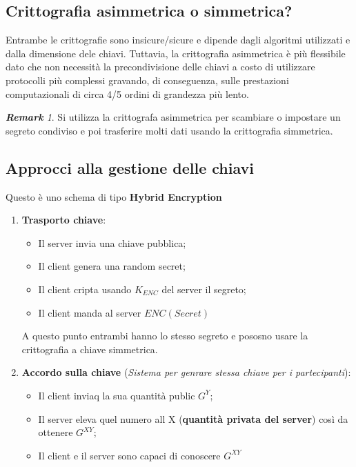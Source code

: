 \documentclass{book}
\theoremstyle{remark}
\newtheorem*{remark}{\textbf{Remark}}
\begin{document}
\subsection{Crittografia asimmetrica o simmetrica?}
Entrambe le crittografie sono insicure/sicure e dipende dagli algoritmi utilizzati e dalla dimensione dele chiavi\@. Tuttavia, la crittografia asimmetrica è più flessibile dato che non necessità la precondivisione delle chiavi a costo di utilizzare protocolli più complessi gravando, di conseguenza,
sulle prestazioni computazionali di circa 4/5 ordini di grandezza più lento\@.
\begin{remark}
	Si utilizza la crittografa asimmetrica per scambiare o impostare un segreto condiviso e poi trasferire molti dati usando la crittografia simmetrica\@.
\end{remark}
\subsection{Approcci alla gestione delle chiavi}
Questo è uno schema di tipo \textbf{Hybrid Encryption}
\begin{enumerate}
	\item \textbf{Trasporto chiave}:\begin{itemize}
		      \item Il server invia una chiave pubblica;\@
		      \item Il client genera una random secret;\@
		      \item Il client cripta usando \(K_{ENC}\) del server il segreto;\@
		      \item Il client manda al server \(ENC (Secret)\)
	      \end{itemize}
	      A questo punto entrambi hanno lo stesso segreto e pososno usare la crittografia a chiave simmetrica\@.
	\item \textbf{Accordo sulla chiave} (\emph{Sistema per genrare stessa chiave per i partecipanti}):\begin{itemize}
		      \item Il client inviaq la sua quantità public \(G^Y\);\@
		      \item Il server eleva quel numero all X (\textbf{quantità privata del server}) così da ottenere \(G^{XY}\);\@
		      \item Il client e il server sono capaci di conoscere \(G^{XY}\)
	      \end{itemize}
\end{enumerate}
\end{document}
